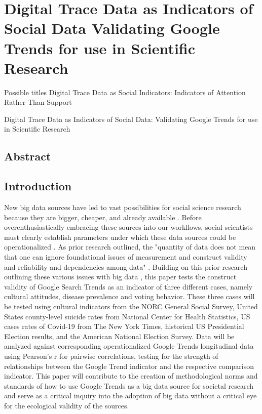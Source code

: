 \hypertarget{paper-1}{%
\chapter{Digital Trace Data as Indicators of Social Data Validating Google Trends for  use in Scientific Research}\label{paper-1}}

Possible titles Digital Trace Data as Social Indicators: Indicators of
Attention Rather Than Support

Digital Trace Data as Indicators of Social Data: Validating Google Trends for
 use in Scientific Research


\section{Abstract}

\section{Introduction}
New big data sources have led to vast possibilities for social science
research because they are bigger, cheaper, and already available
\citep{kingEnsuringDataRichFuture2011,lazerComputationalSocialScience2009,salganikBitBitSocial2017}. Before overenthusiastically embracing these
sources into our workflows, social scientists must clearly establish
parameters under which these data sources could be operationalized
\citep{bailCulturalEnvironmentMeasuring2014, lazerParableGoogleFlu2014}. As
prior research outlined, the "quantity of data does not mean that one
can ignore foundational issues of measurement and construct validity and
reliability and dependencies among data" \citep[p. 1203]{lazerParableGoogleFlu2014}. Building on this prior research outlining these various
issues with big data \citep{boydCriticalQuestionsBig2012,lazerIssuesConstructValidity2015}, this paper tests the construct
validity of Google Search Trends as an indicator of three different
cases, namely cultural attitudes, disease prevalence and voting
behavior. These three cases will be tested using cultural indicators
from the NORC General Social Survey, United States county-level suicide
rates from National Center for Health Statistics, US cases rates of
Covid-19 from The New York Times, historical US Presidential Election
results, and the American National Election Survey. Data will be
analyzed against corresponding operationalized Google Trends
longitudinal data using Pearson's r for pairwise correlations, testing
for the strength of relationships between the Google Trend indicator and
the respective comparison indicator. This paper will contribute to the
creation of methodological norms and standards of how to use Google
Trends as a big data source for societal research and serve as a
critical inquiry into the adoption of big data without a critical eye
for the ecological validity of the sources.

